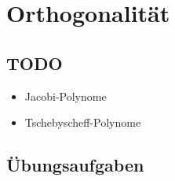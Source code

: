 %
%
%
\chapter{Orthogonalität
\label{buch:chapter:orthogonalitaet}}
\rhead{}







\section{TODO}
\begin{itemize}
\item Jacobi-Polynome
\item Tschebyscheff-Polynome
\end{itemize}

\section*{Übungsaufgaben}
\begin{uebungsaufgaben}
\end{uebungsaufgaben}

